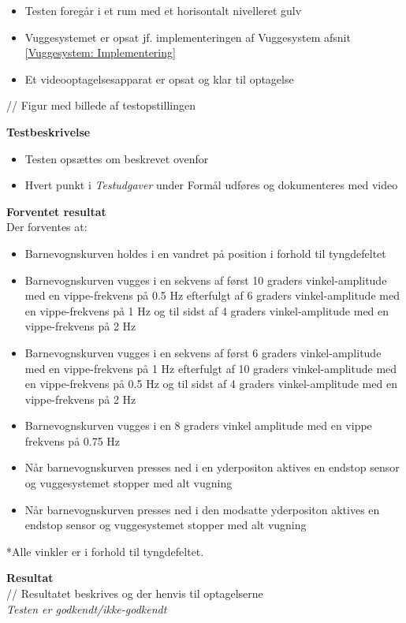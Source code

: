 \begin{itemize}
	\item Testen foregår i et rum med et horisontalt nivelleret gulv
	\item Vuggesystemet er opsat jf. implementeringen af Vuggesystem afsnit \ref{Vuggesystem: Implementering}
	\item Et videooptagelsesapparat er opsat og klar til optagelse
\end{itemize}
// Figur med billede af testopstillingen

\textbf{Testbeskrivelse}
\begin{itemize}
	\item Testen opsættes om beskrevet ovenfor
	\item Hvert punkt i \textit{Testudgaver} under Formål udføres og dokumenteres med video
\end{itemize}

\textbf{Forventet resultat} \\
Der forventes at:
\begin{itemize}
	\item Barnevognskurven holdes i en vandret på position i forhold til tyngdefeltet
	\item Barnevognskurven vugges i en sekvens af først 10 graders vinkel-amplitude med en vippe-frekvens på 0.5 Hz efterfulgt af 6 graders vinkel-amplitude med en vippe-frekvens på 1 Hz og til sidst af 4 graders vinkel-amplitude med en vippe-frekvens på 2 Hz
	\item Barnevognskurven vugges i en sekvens af først 6 graders vinkel-amplitude med en vippe-frekvens på 1 Hz efterfulgt af 10 graders vinkel-amplitude med en vippe-frekvens på 0.5 Hz og til sidst af 4 graders vinkel-amplitude med en vippe-frekvens på 2 Hz
	\item Barnevognskurven vugges i en 8 graders vinkel amplitude med en vippe frekvens på 0.75 Hz
	\item Når barnevognskurven presses ned i en yderpositon aktives en endstop sensor og vuggesystemet stopper med alt vugning 
	\item Når barnevognskurven presses ned i den modsatte yderpositon aktives en endstop sensor og vuggesystemet stopper med alt vugning 
\end{itemize}
*Alle vinkler er i forhold til tyngdefeltet.

\textbf{Resultat} \\
// Resultatet beskrives og der henvis til optagelserne \\


\textit{Testen er godkendt/ikke-godkendt}